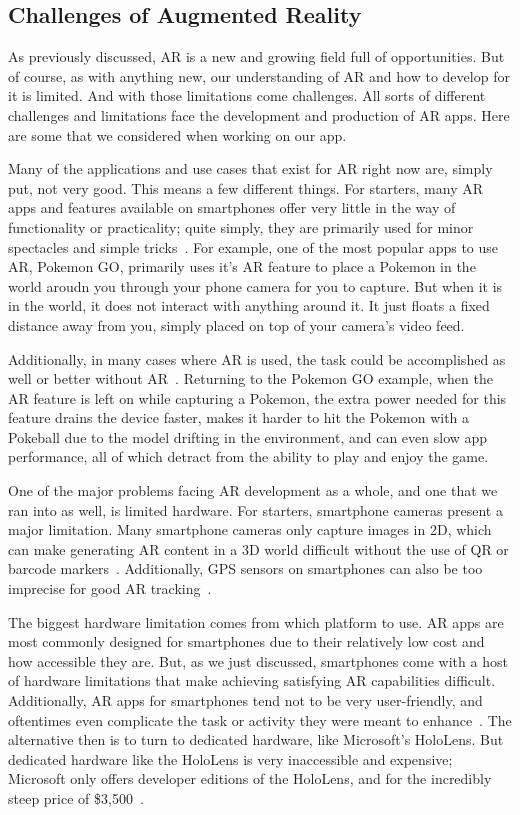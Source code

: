 \documentclass[a4paper, 10pt, american, titlepage]{article}
\begin{document}
\subsection{Challenges of Augmented Reality}
\label{sec:challengesOfAugmentedReality}

As previously discussed, AR is a new and growing field full of opportunities.
But of course, as with anything new, our understanding of AR and how to develop
for it is limited.  And with those limitations come challenges. All sorts of
different challenges and limitations face the development and production of AR
apps. Here are some that we considered when working on our app.

Many of the applications and use cases that exist for AR right now are, simply
put, not very good. This means a few different things. For starters, many AR
apps and features available on smartphones offer very little in the way of
functionality or practicality; quite simply, they are primarily used for minor
spectacles and simple tricks~\autocite{theappsolutions2018}. For example, one
of the most popular apps to use AR, Pokemon GO, primarily uses it's AR feature
to place a Pokemon in the world aroudn you through your phone camera for you to
capture. But when it is in the world, it does not interact with anything around
it. It just floats a fixed distance away from you, simply placed on top of your
camera's video feed. 

Additionally, in many cases where AR is used, the task could be accomplished as
well or better without AR~\autocite{theappsolutions2018}. Returning to the
Pokemon GO example, when the AR feature is left on while capturing a Pokemon,
the extra power needed for this feature drains the device faster, makes it
harder to hit the Pokemon with a Pokeball due to the model drifting in the
environment, and can even slow app performance, all of which detract from the
ability to play and enjoy the game. 

One of the major problems facing AR development as a whole, and one that we ran
into as well, is limited hardware. For starters, smartphone cameras present a
major limitation. Many smartphone cameras only capture images in 2D, which can
make generating AR content in a 3D world difficult without the use of QR or
barcode markers~\autocite{geospatialworld2018}. Additionally, GPS sensors on
smartphones can also be too imprecise for good AR
tracking~\autocite{geospatialworld2018}.

The biggest hardware limitation comes from which platform to use. AR apps are
most commonly designed for smartphones due to their relatively low cost and how
accessible they are. But, as we just discussed, smartphones come with a host of
hardware limitations that make achieving satisfying AR capabilities difficult.
Additionally, AR apps for smartphones tend not to be very user-friendly, and
oftentimes even complicate the task or activity they were meant to
enhance~\autocite{theappsolutions2018}.  The alternative then is to turn to
dedicated hardware, like Microsoft's HoloLens.  But dedicated hardware like the
HoloLens is very inaccessible and expensive; Microsoft only offers developer
editions of the HoloLens, and for the incredibly steep price of
\$3,500~\autocite{microsoft2019}. 
\end{document}
